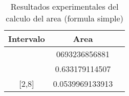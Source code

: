 \begin{table}[!ht]
\begin{center}
\begin{tabular}{|c||c||c|} \hline 
  \textbf{Intervalo} & \textbf{Area}  \\ \hline \hline
[-1,1] &  0693236856881
\\
\hline
[-1,4] & 0.633179114507
\\
\hline

[2,8] & 0.0539969133913
\\
\hline
\hline

\end{tabular}
\end{center}
\caption{Resultados experimentales del calculo del area (formula simple)}
\label{tab:1}
\end{table}

